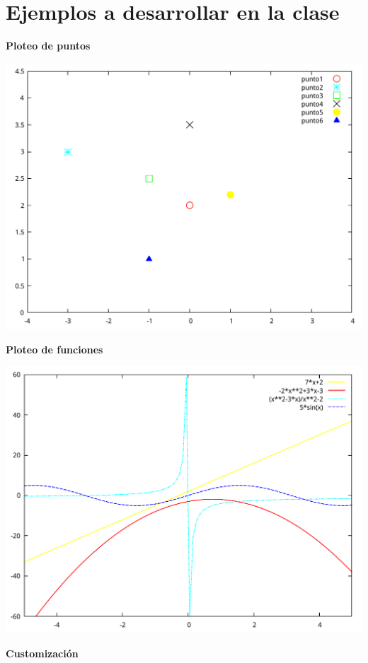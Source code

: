 \documentclass[11.5pt,a4paper]{article}
\begin{document}
\section{Ejemplos a desarrollar en la clase}

\textbf{Ploteo de puntos}

\includegraphics[scale=0.35]{ejemplo1.pdf} 

\textbf{Ploteo de funciones}

\includegraphics[scale=0.35]{ejemplo2.pdf} 

\textbf{Customización}
\end{document}
